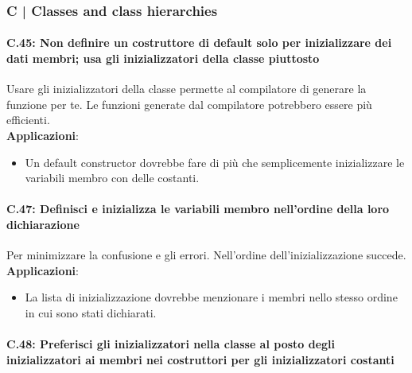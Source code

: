 \newpage

\subsubsection{C | Classes and class hierarchies}

\paragraph{C.45: Non definire un costruttore di default solo per inizializzare dei dati membri; usa gli inizializzatori della classe piuttosto}

\textsf{\small Usare gli inizializzatori della classe permette al compilatore di generare la funzione per te. Le funzioni generate dal compilatore potrebbero essere più efficienti.} \\

\textsf{\small \textbf{Applicazioni}: }

\begin{itemize}
	\item \textsf{\small Un default constructor dovrebbe fare di più che semplicemente inizializzare le variabili membro con delle costanti.}
\end{itemize}

\paragraph{C.47: Definisci e inizializza le variabili membro nell'ordine della loro dichiarazione}

\textsf{\small Per minimizzare la confusione e gli errori. Nell'ordine dell'inizializzazione succede.} \\

\textsf{\small \textbf{Applicazioni}: }

\begin{itemize}
	\item \textsf{\small La lista di inizializzazione dovrebbe menzionare i membri nello stesso ordine in cui sono stati dichiarati.}
\end{itemize}

\paragraph{C.48: Preferisci gli inizializzatori nella classe al posto degli inizializzatori ai membri nei costruttori per gli inizializzatori costanti} %

